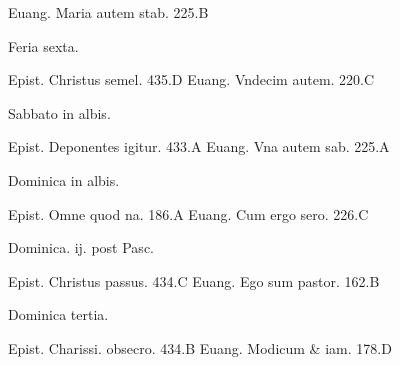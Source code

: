 \documentclass[a5paper,10pt]{book}
\begin{document}
\begin{multicols}{2}
\newline Euang. Maria autem stab. \hfill 225.B
\newline \vspace{-1.75em}
\begin{center}
\color{red} Feria sexta.
\end{center}
\vspace{-.75em}
\par \noindent Epist. Christus semel. \hfill 435.D
\newline Euang. Vndecim autem. \hfill 220.C
\newline \vspace{-1.75em}
\begin{center}
\color{red} Sabbato in albis.
\end{center}
\vspace{-.75em}
\par \noindent Epist. Deponentes igitur. \hfill 433.A
\newline Euang. Vna autem sab. \hfill 225.A
\newline \vspace{-1.75em}
\begin{center}
\color{red} Dominica in albis.
\end{center}
\vspace{-.75em}
\par \noindent Epist. Omne quod na. \hfill 186.A
\newline Euang. Cum ergo sero. \hfill 226.C
\newline \vspace{-1.75em}
\begin{center}
\color{red} Dominica. ij. post Pasc.
\end{center}
\vspace{-.75em}
\par \noindent Epist. Christus passus. \hfill 434.C
\newline Euang. Ego sum pastor. \hfill 162.B
\newline \vspace{-1.75em}
\begin{center}
\color{red} Dominica tertia.
\end{center}
\vspace{-.75em}
\par \noindent Epist. Charissi. obsecro. \hfill 434.B
\newline Euang. Modicum \& iam. \hfill 178.D
\newline \vspace{-1.75em}
\begin{center}

\end{center}
\end{multicols}
\end{document}
